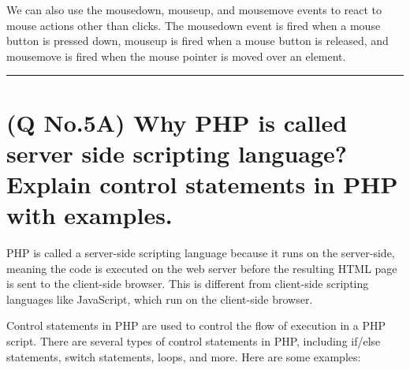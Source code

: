 \documentclass[11pt]{article}
\begin{document}
We can also use the mousedown, mouseup, and mousemove events to react to mouse actions other than clicks. The mousedown event is fired when a mouse button is pressed down, mouseup is fired when a mouse button is released, and mousemove is fired when the mouse pointer is moved over an element.


\noindent\rule{\linewidth}{0.4pt}
\section{(Q No.5A) Why PHP is called server side scripting language? Explain control statements in PHP with examples.} 
PHP is called a server-side scripting language because it runs on the server-side, meaning the code is executed on the web server before the resulting HTML page is sent to the client-side browser. This is different from client-side scripting languages like JavaScript, which run on the client-side browser.

Control statements in PHP are used to control the flow of execution in a PHP script. There are several types of control statements in PHP, including if/else statements, switch statements, loops, and more. Here are some examples:
\end{document}
